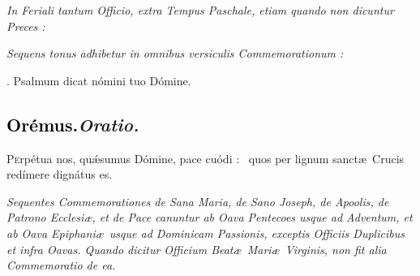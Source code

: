\documentclass[12pt]{article} %
\def\noinitial{%
\gresetfirstlineaboveinitial{\textcolor{benred8}{\small \textsc{\textbf{}}}}{\textcolor{benred8}{\small \textsc{\textbf{}}}}
\setspaceafterinitial{0pt plus 0em minus 0em}%
\setspacebeforeinitial{0pt plus 0em minus 0em}%
\relax %
}
\newenvironment{rubric}{\vspace{2 mm}\color{benred8} \itshape \leftskip 0in \setlength{\parindent}{0.25in}}{\vspace{2 mm}}
\newenvironment{response}{\leftskip 0in \setlength{\parindent}{0in}}{\vspace{2 mm}}
\let\oldgresixstar\gresixstar
\renewcommand{\gresixstar}{\textcolor{benred8}{\oldgresixstar}}
\let\oldRbar\Rbar
\renewcommand{\Rbar}{\textcolor{benred8}{\oldRbar .}}
\def\capitulumSpace{\hspace{20 mm}}
\begin{document}
\begin{rubric}
In Feriali tantum Officio, extra Tempus Paschale, etiam quando non dicuntur Preces :

\end{rubric}


\gresetfirstlineaboveinitial{\small \textsc{ \textbf{\textcolor{benred8}{II}}}}{\small \textsc{ \textbf{\textcolor{benred8}{II}}}}

\begin{rubric}
Sequens tonus adhibetur in omnibus versiculis Commemorationum :

\end{rubric}

{\noinitial
{}

}

\begin{response}
\hspace{1.0 mm}\Rbar\hspace{0.3mm} Psalmum \hspace{3.4mm} dicat \hspace{3.4mm} n\'{o}mini \hspace{3.9mm} tuo \hspace{3.4mm} D\'{o}mine.

\end{response}

\subsection*{\textcolor{black}{Or\'{e}mus.}\capitulumSpace \emph{Oratio.}}

\begin{response}\lettrine[nindent=-1.5mm]{P}{e}rp\'{e}tua nos, qu\'{\ae}sumus D\'{o}mine, pace cu\'{o}di : \gresixstar\ quos per lignum sanct\ae\ Crucis red\'{i}mere dign\'{a}tus es.

\end{response}

\begin{rubric}
Sequentes Commemorationes de Sana Maria, de Sano Joseph, de Apoolis, de Patrono Ecclesi\ae , et de Pace canuntur ab Oava Pentecoes usque ad Adventum, et ab Oava Epiphani\ae\ usque ad Dominicam Passionis, exceptis Officiis Duplicibus et infra Oavas. Quando dicitur Officium Beat\ae\ Mari\ae\ Virginis, non fit alia Commemoratio de ea.

\end{rubric}
\end{document}
